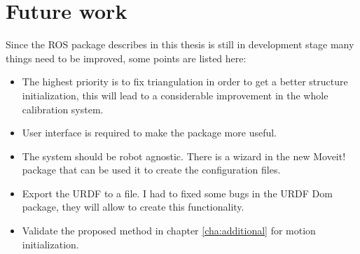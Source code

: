 \chapter{Future work}
\label{cha:future}

Since the ROS package describes in this thesis is still in development stage many things need to be improved, some points are listed here:

\begin{itemize}
 \item The highest priority is to fix triangulation in order to get a better structure initialization, this will lead to a considerable improvement in the whole calibration system.


 \item User interface is required to make the package more useful.

 \item The system should be robot agnostic. There is a wizard in the new Moveit! package that can be used it to create the configuration files.

 \item Export the URDF to a file. I had to fixed some bugs in the URDF Dom package, they will allow to create this functionality.

 \item Validate the proposed method in chapter \ref{cha:additional} for motion initialization.

\end{itemize}
